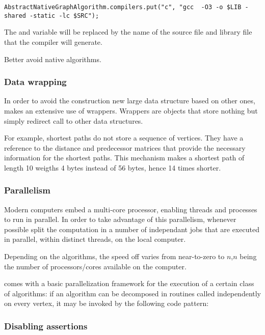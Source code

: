 \documentclass{article}
\begin{document}
\begin{lstlisting}
AbstractNativeGraphAlgorithm.compilers.put("c", "gcc  -O3 -o $LIB -shared -static -lc $SRC");
\end{lstlisting}

The  and  variable will be replaced by the name of the source file and library file that the
compiler will generate.

Better avoid native algorithms.




\subsubsection{Data wrapping}

In order to avoid the construction new large data structure based on other ones, \grph makes an extensive use
of wrappers. Wrappers are objects that store nothing but simply redirect call to other data structures.

For example, shortest paths do not store a sequence of vertices. They have a reference to the distance and 
predecessor matrices that provide the necessary information for the shortest paths. This mechanism makes a shortest path of length
10 weigths 4 bytes instead of 56 bytes, hence 14 times shorter.




\subsubsection{Parallelism}

Modern computers embed a multi-core processor, enabling threads and processes to run
in parallel. In order to take advantage of this parallelism,
whenever possible \grph split the computation in a number of independant jobs that are executed 
in parallel, within distinct threads,  on the local computer.

Depending on the algorithms, the speed off varies from near-to-zero to $n$,$n$ being the number of processors/cores available on the computer. 

\grph comes with a basic parallelization framework for the execution of a certain class of algorithms: if an algorithm can be decomposed
in   routines called independently on every vertex, it may be invoked by the following code pattern:



\subsubsection{Disabling assertions}	
		
\end{document}
